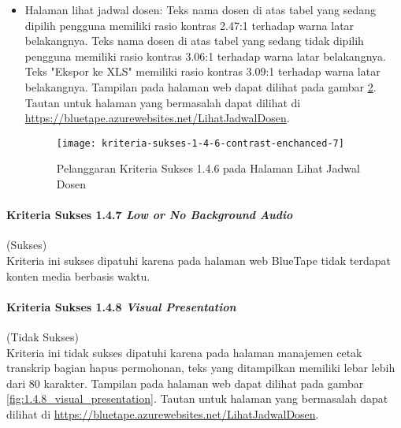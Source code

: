\begin{itemize}
    \begin{figure}[H]
        \centering  
        \texttt{[image: kriteria-sukses-1-4-6-contrast-enchanced-6-2]}  
        \caption[Pelanggaran Kriteria Sukses 1.4.6 pada Kotak Dialog di Halaman Entri Jadwal Dosen]{Pelanggaran Kriteria Sukses 1.4.6 pada Kotak Dialog di Halaman Entri Jadwal Dosen}
        \label{fig:1.4.6_contrast_enchanced_6_2}  
    \end{figure} 

    \item Halaman lihat jadwal dosen: Teks nama dosen di atas tabel yang sedang dipilih pengguna memiliki rasio kontras 2.47:1 terhadap warna latar belakangnya. Teks nama dosen di atas tabel yang sedang tidak dipilih pengguna memiliki rasio kontras 3.06:1 terhadap warna latar belakangnya. Teks "Ekspor ke XLS" memiliki rasio kontras 3.09:1 terhadap warna latar belakangnya. Tampilan pada halaman web dapat dilihat pada gambar \ref{fig:1.4.6_contrast_enchanced_7}. Tautan untuk halaman yang bermasalah dapat dilihat di \url{https://bluetape.azurewebsites.net/LihatJadwalDosen}.
    \begin{figure}[H]
        \centering  
        \texttt{[image: kriteria-sukses-1-4-6-contrast-enchanced-7]}  
        \caption[Pelanggaran Kriteria Sukses 1.4.6 pada Halaman Lihat Jadwal Dosen]{Pelanggaran Kriteria Sukses 1.4.6 pada Halaman Lihat Jadwal Dosen}
        \label{fig:1.4.6_contrast_enchanced_7}  
    \end{figure} 
\end{itemize}

\paragraph{Kriteria Sukses 1.4.7 \textit{Low or No Background Audio}}
\label{par:kepatuhan_bluetape_kriteria_sukses_1.4.7}
(Sukses)\\

Kriteria ini sukses dipatuhi karena pada halaman web BlueTape tidak terdapat konten media berbasis waktu.

\paragraph{Kriteria Sukses 1.4.8 \textit{Visual Presentation}}
\label{par:kepatuhan_bluetape_kriteria_sukses_1.4.8}
(Tidak Sukses)\\

Kriteria ini tidak sukses dipatuhi karena pada halaman manajemen cetak transkrip bagian hapus permohonan, teks yang ditampilkan memiliki lebar lebih dari 80 karakter. Tampilan pada halaman web dapat dilihat pada gambar \ref{fig:1.4.8_visual_presentation}. Tautan untuk halaman yang bermasalah dapat dilihat di \url{https://bluetape.azurewebsites.net/LihatJadwalDosen}.

